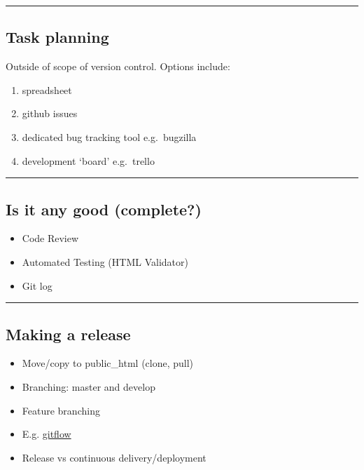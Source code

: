 \documentclass{article}[18pt]
\providecommand{\tightlist}{%
  \setlength{\itemsep}{0pt}\setlength{\parskip}{0pt}}
\begin{document}
\begin{center}\rule{0.5\linewidth}{\linethickness}\end{center}

\hypertarget{task-planning}{%
\subsection{Task planning}\label{task-planning}}

Outside of scope of version control. Options include:

\begin{enumerate}
\def\labelenumi{\arabic{enumi}.}
\tightlist
\item
  spreadsheet
\item
  github issues
\item
  dedicated bug tracking tool e.g.~bugzilla
\item
  development `board' e.g.~trello
\end{enumerate}

\begin{center}\rule{0.5\linewidth}{\linethickness}\end{center}

\hypertarget{is-it-any-good-complete}{%
\subsection{Is it any good (complete?)}\label{is-it-any-good-complete}}

\begin{itemize}
\tightlist
\item Code Review
\item Automated Testing (HTML Validator)
\item Git log
\end{itemize}

\begin{center}\rule{0.5\linewidth}{\linethickness}\end{center}

\hypertarget{making-a-release}{%
\subsection{Making a release}\label{making-a-release}}

\begin{itemize}
\tightlist
\item
  Move/copy to public\_html (clone, pull)
\item
  Branching: master and develop
\item
  Feature branching
\item
  E.g.
  \href{https://www.atlassian.com/git/tutorials/comparing-workflows/gitflow-workflow}{gitflow}
\item
  Release vs continuous delivery/deployment
\end{itemize}
\end{document}
